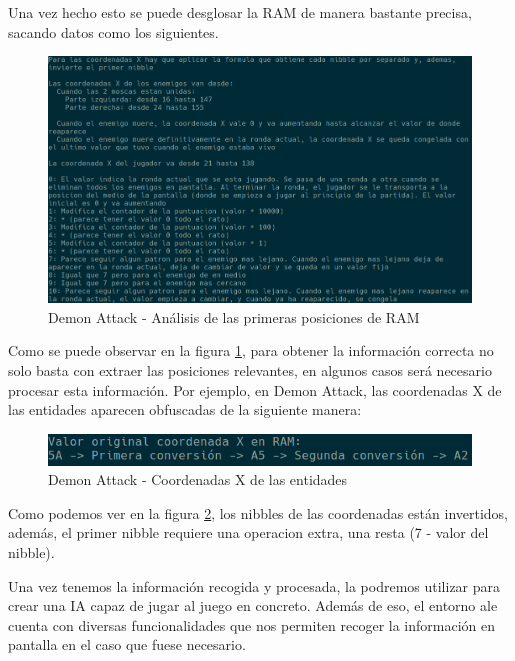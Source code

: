 Una vez hecho esto se puede desglosar la RAM de manera bastante precisa, sacando datos como los siguientes.

\begin{figure}[h]
	\centering
	\includegraphics[width=1\textwidth]{Figures/AnalisisRAM}
	\caption{Demon Attack - Análisis de las primeras posiciones de RAM}
	\label{fig:AnalisisRAM}
\end{figure}

Como se puede observar en la figura \ref{fig:AnalisisRAM}, para obtener la información correcta no solo basta con extraer las posiciones relevantes, en algunos casos será necesario procesar esta información. Por ejemplo, en Demon Attack, las coordenadas X de las entidades aparecen obfuscadas de la siguiente manera:

\begin{figure}[h]
	\centering
	\includegraphics[width=1\textwidth]{Figures/DAttackOpsRequired}
	\caption{Demon Attack - Coordenadas X de las entidades}
	\label{fig:DAttackOpsRequired}
\end{figure}

Como podemos ver en la figura \ref{fig:DAttackOpsRequired}, los nibbles de las coordenadas están invertidos, además, el primer nibble requiere una operacion extra, una resta (7 - valor del nibble). 

Una vez tenemos la información recogida y procesada, la podremos utilizar para crear una IA capaz de jugar al juego en concreto. Además de eso, el entorno \ac{ale} cuenta con diversas funcionalidades que nos permiten recoger la información en pantalla en el caso que fuese necesario. 

